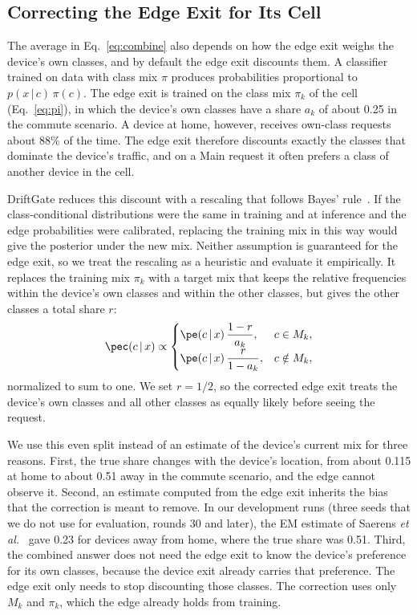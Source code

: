 \subsection{Correcting the Edge Exit for Its Cell}
\label{sec:correct}

The average in Eq.~\eqref{eq:combine} also depends on how the edge exit weighs the device's own classes, and by default the edge exit discounts them. A classifier trained on data with class mix $\pi$ produces probabilities proportional to $p(x\,|\,c)\,\pi(c)$. The edge exit is trained on the class mix $\pi_k$ of the cell (Eq.~\eqref{eq:pi}), in which the device's own classes have a share $a_k$ of about 0.25 in the commute scenario. A device at home, however, receives own-class requests about 88\% of the time. The edge exit therefore discounts exactly the classes that dominate the device's traffic, and on a Main request it often prefers a class of another device in the cell.

DriftGate reduces this discount with a rescaling that follows Bayes' rule~\cite{saerens2002adjusting}. If the class-conditional distributions were the same in training and at inference and the edge probabilities were calibrated, replacing the training mix in this way would give the posterior under the new mix. Neither assumption is guaranteed for the edge exit, so we treat the rescaling as a heuristic and evaluate it empirically. It replaces the training mix $\pi_k$ with a target mix that keeps the relative frequencies within the device's own classes and within the other classes, but gives the other classes a total share $r$:
\begin{equation}
\pec(c\,|\,x)\propto
\begin{cases}
\pe(c\,|\,x)\,\dfrac{1-r}{a_k}, & c\in M_k,\\[2mm]
\pe(c\,|\,x)\,\dfrac{r}{1-a_k}, & c\notin M_k,
\end{cases}
\label{eq:correct}
\end{equation}
normalized to sum to one. We set $r=1/2$, so the corrected edge exit treats the device's own classes and all other classes as equally likely before seeing the request.

We use this even split instead of an estimate of the device's current mix for three reasons. First, the true share changes with the device's location, from about 0.115 at home to about 0.51 away in the commute scenario, and the edge cannot observe it. Second, an estimate computed from the edge exit inherits the bias that the correction is meant to remove. In our development runs (three seeds that we do not use for evaluation, rounds 30 and later), the EM estimate of Saerens \emph{et al.}~\cite{saerens2002adjusting} gave 0.23 for devices away from home, where the true share was 0.51. Third, the combined answer does not need the edge exit to know the device's preference for its own classes, because the device exit already carries that preference. The edge exit only needs to stop discounting those classes. The correction uses only $M_k$ and $\pi_k$, which the edge already holds from training.

